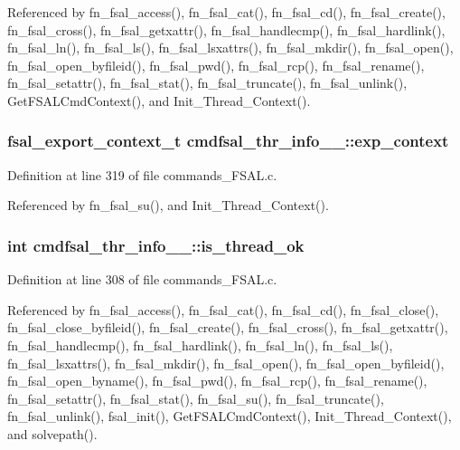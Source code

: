 Referenced by fn\_\-fsal\_\-access(), fn\_\-fsal\_\-cat(), fn\_\-fsal\_\-cd(), fn\_\-fsal\_\-create(), fn\_\-fsal\_\-cross(), fn\_\-fsal\_\-getxattr(), fn\_\-fsal\_\-handlecmp(), fn\_\-fsal\_\-hardlink(), fn\_\-fsal\_\-ln(), fn\_\-fsal\_\-ls(), fn\_\-fsal\_\-lsxattrs(), fn\_\-fsal\_\-mkdir(), fn\_\-fsal\_\-open(), fn\_\-fsal\_\-open\_\-byfileid(), fn\_\-fsal\_\-pwd(), fn\_\-fsal\_\-rcp(), fn\_\-fsal\_\-rename(), fn\_\-fsal\_\-setattr(), fn\_\-fsal\_\-stat(), fn\_\-fsal\_\-truncate(), fn\_\-fsal\_\-unlink(), Get\-FSALCmd\-Context(), and Init\_\-Thread\_\-Context().
\subsubsection{\setlength{\rightskip}{0pt plus 5cm}fsal\_\-export\_\-context\_\-t {\bf cmdfsal\_\-thr\_\-info\_\-\_\-::exp\_\-context}}\label{structcmdfsal__thr__info_____o4}




Definition at line 319 of file commands\_\-FSAL.c.

Referenced by fn\_\-fsal\_\-su(), and Init\_\-Thread\_\-Context().
\subsubsection{\setlength{\rightskip}{0pt plus 5cm}int {\bf cmdfsal\_\-thr\_\-info\_\-\_\-::is\_\-thread\_\-ok}}\label{structcmdfsal__thr__info_____o0}




Definition at line 308 of file commands\_\-FSAL.c.

Referenced by fn\_\-fsal\_\-access(), fn\_\-fsal\_\-cat(), fn\_\-fsal\_\-cd(), fn\_\-fsal\_\-close(), fn\_\-fsal\_\-close\_\-byfileid(), fn\_\-fsal\_\-create(), fn\_\-fsal\_\-cross(), fn\_\-fsal\_\-getxattr(), fn\_\-fsal\_\-handlecmp(), fn\_\-fsal\_\-hardlink(), fn\_\-fsal\_\-ln(), fn\_\-fsal\_\-ls(), fn\_\-fsal\_\-lsxattrs(), fn\_\-fsal\_\-mkdir(), fn\_\-fsal\_\-open(), fn\_\-fsal\_\-open\_\-byfileid(), fn\_\-fsal\_\-open\_\-byname(), fn\_\-fsal\_\-pwd(), fn\_\-fsal\_\-rcp(), fn\_\-fsal\_\-rename(), fn\_\-fsal\_\-setattr(), fn\_\-fsal\_\-stat(), fn\_\-fsal\_\-su(), fn\_\-fsal\_\-truncate(), fn\_\-fsal\_\-unlink(), fsal\_\-init(), Get\-FSALCmd\-Context(), Init\_\-Thread\_\-Context(), and solvepath().
